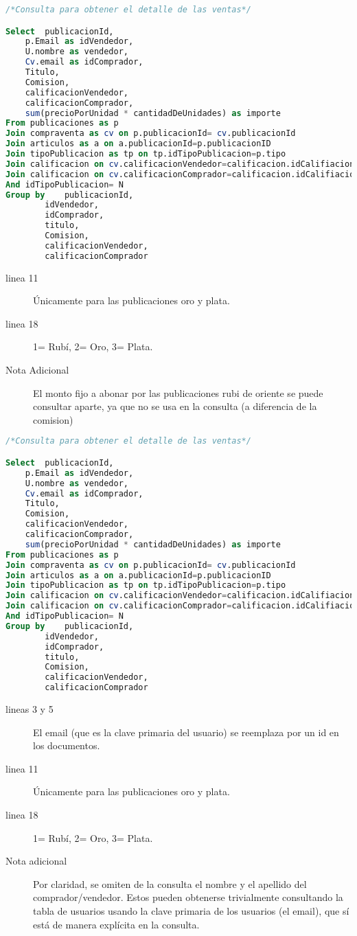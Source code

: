   \begin{lstlisting}[language=SQL]
/*Consulta para obtener el detalle de las ventas*/

Select	publicacionId,
	p.Email as idVendedor,
	U.nombre as vendedor,
	Cv.email as idComprador,
	Titulo,
	Comision,
	calificacionVendedor,
	calificacionComprador,
	sum(precioPorUnidad * cantidadDeUnidades) as importe
From publicaciones as p 
Join compraventa as cv on p.publicacionId= cv.publicacionId 
Join articulos as a on a.publicacionId=p.publicacionID
Join tipoPublicacion as tp on tp.idTipoPublicacion=p.tipo
Join calificacion on cv.calificacionVendedor=calificacion.idCalifiacion
Join calificacion on cv.calificacionComprador=calificacion.idCalifiacion
And idTipoPublicacion= N
Group by 	publicacionId,
		idVendedor,
		idComprador,
		titulo,
		Comision,    
		calificacionVendedor,
		calificacionComprador

  \end{lstlisting}
  \begin{description}
 \item[linea 11] Únicamente para las publicaciones oro y plata.
 \item[linea 18] 1= Rubí, 2= Oro, 3= Plata.
  \item[Nota Adicional] El monto fijo a abonar por las publicaciones rubi de oriente se puede consultar aparte, ya que
 no se usa en la consulta (a diferencia de la comision)

  \end{description}
\newpage
   \begin{lstlisting}[language=SQL]
/*Consulta para obtener el detalle de las ventas*/

Select	publicacionId,
	p.Email as idVendedor,
	U.nombre as vendedor,
	Cv.email as idComprador,
	Titulo,
	Comision,
	calificacionVendedor,
	calificacionComprador,
	sum(precioPorUnidad * cantidadDeUnidades) as importe
From publicaciones as p 
Join compraventa as cv on p.publicacionId= cv.publicacionId 
Join articulos as a on a.publicacionId=p.publicacionID
Join tipoPublicacion as tp on tp.idTipoPublicacion=p.tipo
Join calificacion on cv.calificacionVendedor=calificacion.idCalifiacion
Join calificacion on cv.calificacionComprador=calificacion.idCalifiacion
And idTipoPublicacion= N
Group by 	publicacionId,
		idVendedor,
		idComprador,
		titulo,
		Comision,    
		calificacionVendedor,
		calificacionComprador

  \end{lstlisting}
  \begin{description}
 \item[lineas 3 y 5] El email (que es la clave primaria del usuario) se reemplaza por un id en los documentos.
 \item[linea 11] Únicamente para las publicaciones oro y plata.
 \item[linea 18] 1= Rubí, 2= Oro, 3= Plata.
 \item[Nota adicional] Por claridad, se omiten de la consulta el nombre y el apellido del comprador/vendedor.
 Estos pueden obtenerse trivialmente consultando la tabla de usuarios usando la clave primaria de los usuarios
 (el email), que sí está de manera explícita en la consulta.

  \end{description}
